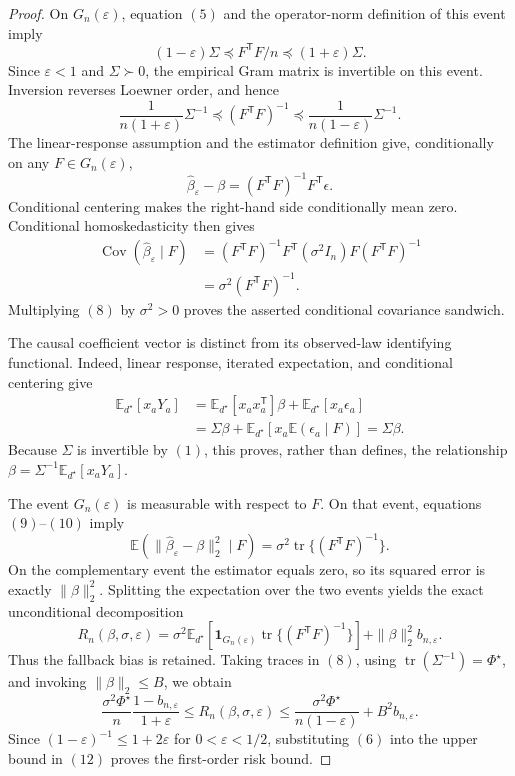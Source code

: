\documentclass{article}
\begin{document}
\begin{proof}
On \(G_n(\varepsilon)\), equation \((5)\) and the operator-norm definition of this event imply
\[
 (1-\varepsilon)\Sigma
 \preceq F^{\mathsf T}F/n
 \preceq(1+\varepsilon)\Sigma.
 \tag{7}
\]
Since \(\varepsilon<1\) and \(\Sigma\succ0\), the empirical Gram matrix is invertible on this event.  Inversion reverses Loewner order, and hence
\[
 \frac1{n(1+\varepsilon)}\Sigma^{-1}
 \preceq(F^{\mathsf T}F)^{-1}
 \preceq\frac1{n(1-\varepsilon)}\Sigma^{-1}.
 \tag{8}
\]
The linear-response assumption and the estimator definition give, conditionally on any \(F\in G_n(\varepsilon)\),
\[
 \widehat\beta_\varepsilon-\beta
 =(F^{\mathsf T}F)^{-1}F^{\mathsf T}\epsilon.
 \tag{9}
\]
Conditional centering makes the right-hand side conditionally mean zero.  Conditional homoskedasticity then gives
\[
\begin{aligned}
 \operatorname{Cov}(\widehat\beta_\varepsilon\mid F)
 &=(F^{\mathsf T}F)^{-1}F^{\mathsf T}(\sigma^2I_n)F(F^{\mathsf T}F)^{-1}\\
 &=\sigma^2(F^{\mathsf T}F)^{-1}.
\end{aligned}
 \tag{10}
\]
Multiplying \((8)\) by \(\sigma^2>0\) proves the asserted conditional covariance sandwich.

The causal coefficient vector is distinct from its observed-law identifying functional.  Indeed, linear response, iterated expectation, and conditional centering give
\[
\begin{aligned}
 \mathbb E_{d^\star}[x_aY_a]
 &=\mathbb E_{d^\star}[x_ax_a^{\mathsf T}]\beta
   +\mathbb E_{d^\star}[x_a\epsilon_a]\\
 &=\Sigma\beta+
 \mathbb E_{d^\star}\!\left[x_a\mathbb E(\epsilon_a\mid F)\right]
 =\Sigma\beta.
\end{aligned}
\]
Because \(\Sigma\) is invertible by \((1)\), this proves, rather than defines, the relationship \(\beta=\Sigma^{-1}\mathbb E_{d^\star}[x_aY_a]\).

The event \(G_n(\varepsilon)\) is measurable with respect to \(F\).  On that event, equations \((9)\)--\((10)\) imply
\[
 \mathbb E\!\left(\|\widehat\beta_\varepsilon-\beta\|_2^2\mid F\right)
 =\sigma^2\operatorname{tr}\{(F^{\mathsf T}F)^{-1}\}.
\]
On the complementary event the estimator equals zero, so its squared error is exactly \(\|\beta\|_2^2\).  Splitting the expectation over the two events yields the exact unconditional decomposition
\[
 R_n(\beta,\sigma,\varepsilon)
 =\sigma^2\mathbb E_{d^\star}\!\left[
 \mathbf 1_{G_n(\varepsilon)}\operatorname{tr}\{(F^{\mathsf T}F)^{-1}\}\right]
 +\|\beta\|_2^2b_{n,\varepsilon}.
 \tag{11}
\]
Thus the fallback bias is retained.  Taking traces in \((8)\), using \(\operatorname{tr}(\Sigma^{-1})=\Phi^\star\), and invoking \(\|\beta\|_2\le B\), we obtain
\[
 \frac{\sigma^2\Phi^\star}{n}\frac{1-b_{n,\varepsilon}}{1+\varepsilon}
 \le R_n(\beta,\sigma,\varepsilon)
 \le\frac{\sigma^2\Phi^\star}{n(1-\varepsilon)}+B^2b_{n,\varepsilon}.
 \tag{12}
\]
Since \((1-\varepsilon)^{-1}\le1+2\varepsilon\) for \(0<\varepsilon<1/2\), substituting \((6)\) into the upper bound in \((12)\) proves the first-order risk bound.


\end{proof}
\end{document}
